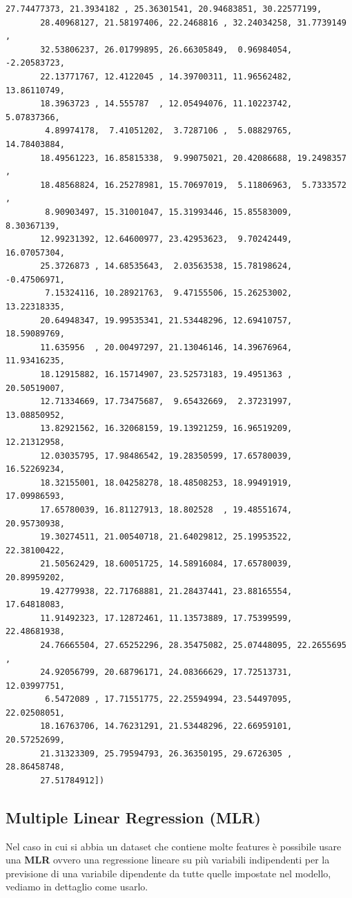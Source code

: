 \documentclass[11pt]{article}
\begin{document}
\begin{Verbatim}[commandchars=\\\{\}]
       27.74477373, 21.3934182 , 25.36301541, 20.94683851, 30.22577199,
       28.40968127, 21.58197406, 22.2468816 , 32.24034258, 31.7739149 ,
       32.53806237, 26.01799895, 26.66305849,  0.96984054, -2.20583723,
       22.13771767, 12.4122045 , 14.39700311, 11.96562482, 13.86110749,
       18.3963723 , 14.555787  , 12.05494076, 11.10223742,  5.07837366,
        4.89974178,  7.41051202,  3.7287106 ,  5.08829765, 14.78403884,
       18.49561223, 16.85815338,  9.99075021, 20.42086688, 19.2498357 ,
       18.48568824, 16.25278981, 15.70697019,  5.11806963,  5.7333572 ,
        8.90903497, 15.31001047, 15.31993446, 15.85583009,  8.30367139,
       12.99231392, 12.64600977, 23.42953623,  9.70242449, 16.07057304,
       25.3726873 , 14.68535643,  2.03563538, 15.78198624, -0.47506971,
        7.15324116, 10.28921763,  9.47155506, 15.26253002, 13.22318335,
       20.64948347, 19.99535341, 21.53448296, 12.69410757, 18.59089769,
       11.635956  , 20.00497297, 21.13046146, 14.39676964, 11.93416235,
       18.12915882, 16.15714907, 23.52573183, 19.4951363 , 20.50519007,
       12.71334669, 17.73475687,  9.65432669,  2.37231997, 13.08850952,
       13.82921562, 16.32068159, 19.13921259, 16.96519209, 12.21312958,
       12.03035795, 17.98486542, 19.28350599, 17.65780039, 16.52269234,
       18.32155001, 18.04258278, 18.48508253, 18.99491919, 17.09986593,
       17.65780039, 16.81127913, 18.802528  , 19.48551674, 20.95730938,
       19.30274511, 21.00540718, 21.64029812, 25.19953522, 22.38100422,
       21.50562429, 18.60051725, 14.58916084, 17.65780039, 20.89959202,
       19.42779938, 22.71768881, 21.28437441, 23.88165554, 17.64818083,
       11.91492323, 17.12872461, 11.13573889, 17.75399599, 22.48681938,
       24.76665504, 27.65252296, 28.35475082, 25.07448095, 22.2655695 ,
       24.92056799, 20.68796171, 24.08366629, 17.72513731, 12.03997751,
        6.5472089 , 17.71551775, 22.25594994, 23.54497095, 22.02508051,
       18.16763706, 14.76231291, 21.53448296, 22.66959101, 20.57252699,
       21.31323309, 25.79594793, 26.36350195, 29.6726305 , 28.86458748,
       27.51784912])
    \end{Verbatim}

    
    \hypertarget{multiple-linear-regression-mlr}{%
\subsection{Multiple Linear Regression
(MLR)}\label{multiple-linear-regression-mlr}}

Nel caso in cui si abbia un dataset che contiene molte features è
possibile usare una \textbf{MLR} ovvero una regressione lineare su più
variabili indipendenti per la previsione di una variabile dipendente da
tutte quelle impostate nel modello, vediamo in dettaglio come usarlo.
\end{document}
